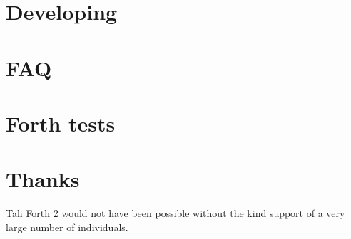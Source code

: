 \documentclass[a4paper,notitlepage]{report}
\begin{document}
\chapter{Developing}
        




\appendix

\chapter{FAQ}
        

\chapter{Forth tests}
%       

\chapter{Thanks}
Tali Forth 2 would not have been possible without the kind support of a very
large number of individuals.

\begin{theindex}
\end{theindex}
\end{document}
